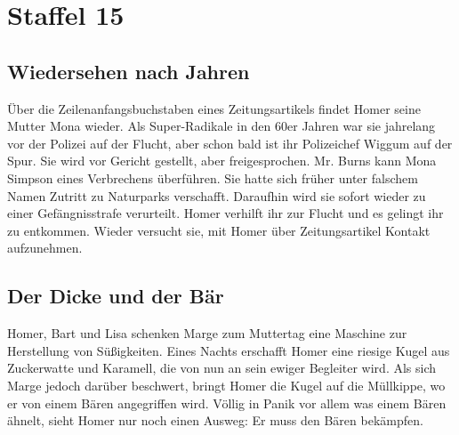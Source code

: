 
\section{Staffel 15}
 	
\subsection{Wiedersehen nach Jahren}\label{EABF18}
Über die Zeilenanfangsbuchstaben eines Zeitungsartikels findet Homer seine Mutter Mona wieder. Als Super-Radikale in den 60er Jahren war sie jahrelang vor der Polizei auf der Flucht, aber schon bald ist ihr Polizeichef Wiggum auf der Spur. Sie wird vor Gericht gestellt, aber freigesprochen. Mr. Burns kann Mona Simpson eines Verbrechens überführen. Sie hatte sich früher unter falschem Namen Zutritt zu Naturparks verschafft. Daraufhin wird sie sofort wieder zu einer Gefängnisstrafe verurteilt. Homer verhilft ihr zur Flucht und es gelingt ihr zu entkommen. Wieder versucht sie, mit Homer über Zeitungsartikel Kontakt aufzunehmen.


	
\subsection{Der Dicke und der Bär}\label{EABF19}
Homer, Bart und Lisa schenken Marge zum Muttertag eine Maschine zur Herstellung von Süßigkeiten. Eines Nachts erschafft Homer eine riesige Kugel aus Zuckerwatte und Karamell, die von nun an sein ewiger Begleiter wird. Als sich Marge jedoch darüber beschwert, bringt Homer die Kugel auf die Müllkippe, wo er von einem Bären angegriffen wird. Völlig in Panik vor allem was einem Bären ähnelt, sieht Homer nur noch einen Ausweg: Er muss den Bären bekämpfen.

